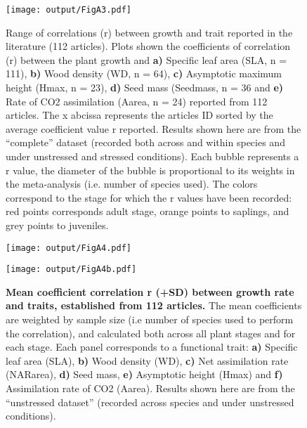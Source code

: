\documentclass[a4paper,11pt]{article}
\begin{document}
\begin{appendices}
\begin{figure}[h!]
\centering
\texttt{[image: output/FigA3.pdf]}
\caption{Range of correlations (r) between
growth and trait reported in the literature (112 articles). Plots shown the coefficients of correlation (r)
between the plant growth and \textbf{a)} Specific leaf area (SLA, n =
111), \textbf{b)} Wood density (WD, n = 64), \textbf{c)} Asymptotic
maximum height (Hmax, n = 23), \textbf{d)} Seed mass (Seedmass, n = 36 and
\textbf{e)} Rate of CO2 assimilation (Aarea, n = 24) reported from 112
articles. The x abcissa represents the articles ID sorted by the average coefficient value r reported.
Results shown here are from the ``complete'' dataset (recorded both across and within species
and under unstressed and stressed conditions). Each bubble represents a r value, the diameter of the bubble
is proportional to its weights in the meta-analysis (i.e. number of species used). The colors
correspond to the stage for which the r values have been recorded: red
points corresponds adult stage, orange points to saplings, and grey
points to juveniles.}
\label{fig:figA3}
\end{figure}

\begin{figure}[h!]
\centering
\texttt{[image: output/FigA4.pdf]}
\end{figure}

\begin{figure}[h!]
\centering
\texttt{[image: output/FigA4b.pdf]}
\caption{\textbf{Mean coefficient correlation r (+SD) between growth rate and traits, established from 112 articles.} The mean coefficients are weighted by sample size (i.e number of species used to perform the correlation), and calculated both across all plant stages and for each stage. Each panel corresponds to a functional trait: \textbf{a)} Specific leaf area (SLA), \textbf{b)} Wood density (WD), \textbf{c)} Net assimilation rate (NARarea), \textbf{d)} Seed mass, \textbf{e)} Asymptotic height (Hmax) and \textbf{f)} Assimilation rate of CO2 (Aarea). Results shown here are from the ``unstressed dataset'' (recorded across species and under unstressed conditions).}
\label{fig:figA4}
\end{figure}


\end{appendices}
\end{document}
